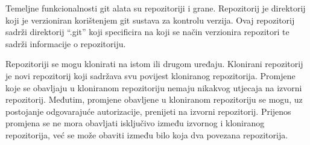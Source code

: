 \documentclass[times, utf8, diplomski, numeric]{fer}
\begin{document}
\begin{appendices}
Temeljne funkcionalnosti git alata su repozitoriji i grane. Repozitorij je direktorij koji je verzioniran korištenjem git sustava za kontrolu verzija. Ovaj repozitorij sadrži direktorij “.git” koji specificira na koji se način verzionira repozitori te sadrži informacije o repozitoriju.

Repozitoriji se mogu klonirati na istom ili drugom uređaju. Klonirani repozitorij je novi repozitorij koji sadržava svu povijest kloniranog repozitorija. Promjene koje se obavljaju u kloniranom repozitoriju nemaju nikakvog utjecaja na izvorni repozitorij. Međutim, promjene obavljene u kloniranom repozitoriju se mogu, uz postojanje odgovarajuće autorizacije, prenijeti na izvorni repozitorij. Prijenos promjena se ne mora obavljati isključivo između izvornog i kloniranog repozitorija, već se može obaviti između bilo koja dva povezana repozitorija.


\end{appendices}
\end{document}
